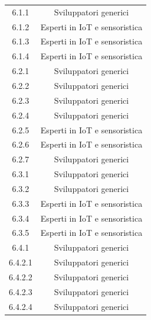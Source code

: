 \begin{table}[H]
\begin{tabular}{|c|c|}
        6.1.1             & Sviluppatori generici                                    \\
        6.1.2             & Esperti in IoT e sensoristica                            \\
        6.1.3             & Esperti in IoT e sensoristica                            \\
        6.1.4             & Esperti in IoT e sensoristica                            \\
        6.2.1             & Sviluppatori generici                                    \\
        6.2.2             & Sviluppatori generici                                    \\
        6.2.3             & Sviluppatori generici                                    \\
        6.2.4             & Sviluppatori generici                                    \\
        6.2.5             & Esperti in IoT e sensoristica                            \\
        6.2.6             & Esperti in IoT e sensoristica                            \\
        6.2.7             & Sviluppatori generici                                    \\
        6.3.1             & Sviluppatori generici                                    \\
        6.3.2             & Sviluppatori generici                                    \\
        6.3.3             & Esperti in IoT e sensoristica                            \\
        6.3.4             & Esperti in IoT e sensoristica                            \\
        6.3.5             & Esperti in IoT e sensoristica                            \\
        6.4.1             & Sviluppatori generici                                    \\
        6.4.2.1           & Sviluppatori generici                                    \\
        6.4.2.2           & Sviluppatori generici                                    \\
        6.4.2.3           & Sviluppatori generici                                    \\
        6.4.2.4           & Sviluppatori generici                                    \\

\end{tabular}
\end{table}
